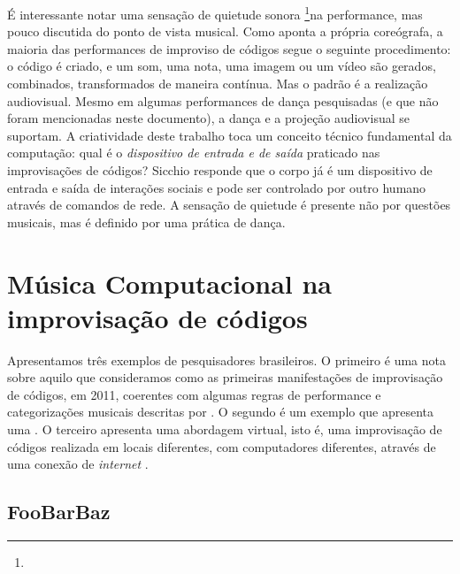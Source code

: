 É interessante notar uma sensação de quietude sonora \footnote{}na performance, mas pouco discutida do ponto de vista musical. Como aponta a própria coreógrafa, a maioria das performances de improviso de códigos segue o seguinte procedimento: o código é criado, e um som, uma nota, uma imagem ou um vídeo são gerados, combinados, transformados de maneira contínua. Mas o padrão é a realização audiovisual. Mesmo em algumas performances de dança pesquisadas (e que não foram mencionadas neste documento), a dança e a projeção audiovisual se suportam. A criatividade deste trabalho toca um conceito técnico fundamental da computação: qual é o \emph{dispositivo de entrada e de saída} praticado nas improvisações de códigos? Sicchio responde que o corpo já é um dispositivo de entrada e saída de interações sociais e pode ser controlado por outro humano através de comandos de rede. A sensação de quietude é presente não por questões musicais, mas é definido por uma prática de dança.


\section{Música Computacional na improvisação de códigos}\label{sec:musica}

Apresentamos três exemplos de pesquisadores brasileiros. O primeiro é uma nota sobre aquilo que consideramos como as primeiras manifestações de improvisação de códigos, em 2011, coerentes com algumas regras de performance e categorizações musicais  descritas por . O segundo é um exemplo que apresenta uma \cite[p.~1, ver \protect\autoref{sec:concerto}, p.~\protect\pageref{sec:concerto}]{mclean_tidal_2010}. O terceiro apresenta uma abordagem virtual, isto é, uma improvisação de códigos realizada em locais diferentes, com computadores diferentes, através de uma conexão de \emph{internet} .  


\subsection{FooBarBaz}\label{sec:foobarbaz}

